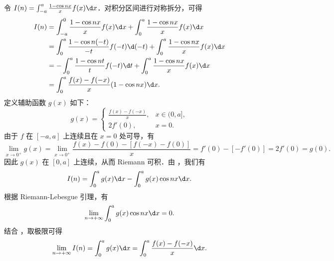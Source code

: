\begin{myproof}
    令 $I(n) = \int_{-a}^{a} \frac{1 - \cos n x}{x} f(x) \d x$．对积分区间进行对称拆分，可得
    \begin{equation}\label{eq:split-5}
        \begin{aligned}
            I(n) & = \int_{-a}^{0} \frac{1 - \cos n x}{x} f(x) \d x + \int_{0}^{a} \frac{1 - \cos n x}{x} f(x) \d x      \\
                 & = \int_{0}^{a} \frac{1 - \cos n(-t)}{-t} f(-t) \d(-t) + \int_{0}^{a} \frac{1 - \cos n x}{x} f(x) \d x \\
                 & = -\int_{0}^{a} \frac{1 - \cos n t}{t} f(-t) \d t + \int_{0}^{a} \frac{1 - \cos n x}{x} f(x) \d x     \\
                 & = \int_{0}^{a} \frac{f(x) - f(-x)}{x} (1 - \cos n x) \d x.
        \end{aligned}
    \end{equation}
    定义辅助函数 $g(x)$ 如下：
    \begin{equation}
        g(x) = \begin{cases}
            \frac{f(x) - f(-x)}{x}, & x \in (0, a], \\
            2f'(0),                 & x = 0.
        \end{cases}
    \end{equation}
    由于 $f$ 在 $[-a, a]$ 上连续且在 $x = 0$ 处可导，有
    \begin{equation}
        \lim_{x \to 0^+} g(x) = \lim_{x \to 0^+} \frac{f(x) - f(0) - [f(-x) - f(0)]}{x} = f'(0) - [-f'(0)] = 2f'(0) = g(0).
    \end{equation}
    因此 $g(x)$ 在 $[0, a]$ 上连续，从而 Riemann 可积．由 ，我们有
    \begin{equation}
        I(n) = \int_{0}^{a} g(x) \d x - \int_{0}^{a} g(x) \cos n x \d x.
    \end{equation}
    根据 Riemann-Lebesgue 引理，有
    \begin{equation}\label{eq:riemann-lebesgue-5}
        \lim_{n \to +\infty} \int_{0}^{a} g(x) \cos n x \d x = 0.
    \end{equation}
    结合 ，取极限可得
    \begin{equation}
        \lim_{n \to +\infty} I(n) = \int_{0}^{a} g(x) \d x = \int_{0}^{a} \frac{f(x) - f(-x)}{x} \d x.
    \end{equation}
\end{myproof}

